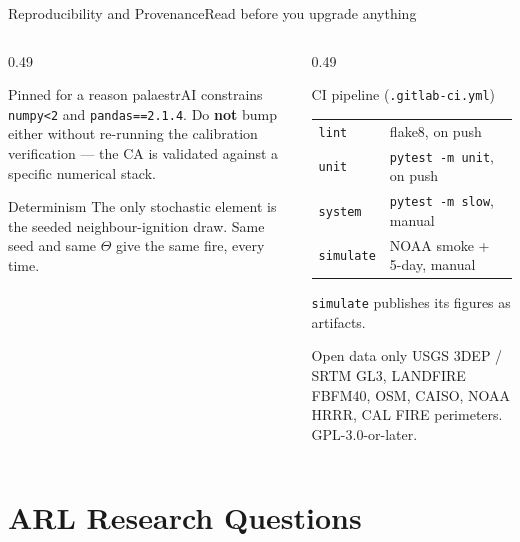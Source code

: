 \documentclass[aspectratio=169,9pt]{beamer}
\newcommand{\code}[1]{{\small\texttt{#1}}}
\begin{document}
\begin{frame}{Reproducibility and Provenance}{Read before you upgrade anything}
  \begin{columns}[T,onlytextwidth]
    \begin{column}{0.49\textwidth}
      \begin{alertblock}{Pinned for a reason}
        \small palaestrAI constrains \code{numpy<2} and
        \code{pandas==2.1.4}. Do \textbf{not} bump either without
        re-running the calibration verification --- the CA is validated
        against a specific numerical stack.
      \end{alertblock}
      \begin{block}{Determinism}
        \small The only stochastic element is the seeded neighbour-ignition
        draw. Same seed and same $\Theta$ give the same fire, every time.
      \end{block}
    \end{column}
    \begin{column}{0.49\textwidth}
      \begin{block}{CI pipeline (\texttt{.gitlab-ci.yml})}
        \small
        \begin{tabular}{@{}l l@{}}
          \code{lint}     & flake8, on push\\
          \code{unit}     & \code{pytest -m unit}, on push\\
          \code{system}   & \code{pytest -m slow}, manual\\
          \code{simulate} & NOAA smoke + 5-day, manual\\
        \end{tabular}
        \vskip3pt
        \code{simulate} publishes its figures as artifacts.
      \end{block}
      \begin{block}{Open data only}
        \small USGS 3DEP / SRTM GL3, LANDFIRE FBFM40, OSM, CAISO, NOAA
        HRRR, CAL FIRE perimeters. GPL-3.0-or-later.
      \end{block}
    \end{column}
  \end{columns}
\end{frame}

\section{ARL Research Questions}
\end{document}
